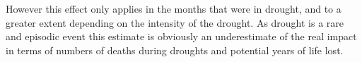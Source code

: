 \documentclass[a4paper]{article}                %
\begin{document}
However this effect only applies in the months that were in
drought, and to a greater extent depending on the intensity of the drought.
As drought is a rare and episodic event this estimate is obviously an underestimate of the real impact in terms of numbers of deaths during droughts and potential years of life lost.










\end{document}
